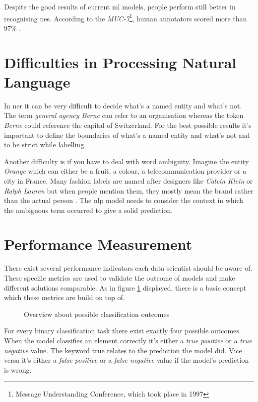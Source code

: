 Despite the good results of current \acrlong{ml} models, people perform still better in recognising \acrshort{ne}s. According to the \emph{MUC-7}\footnote{Message Understanding Conference, which took place in 1997}, human annotators scored more than 97\% \cite{wiki04}. 

\section{Difficulties in Processing Natural Language}

In \acrlong{ner} it can be very difficult to decide what's a named entity and what's not. The term \emph{general agency Berne} can refer to an organisation whereas the token \emph{Berne} could reference the capital of Switzerland. For the best possible results it's important to define the boundaries of what's a named entity and what's not and to be strict while labelling.

Another difficulty is if you have to deal with word ambiguity. Imagine the entity \emph{Orange} which can either be a fruit, a colour, a telecommunication provider or a city in France. Many fashion labels are named after designers like \emph{Calvin Klein} or \emph{Ralph Lauren} but when people mention them, they mostly mean the brand rather than the actual person \cite{Vogel19}. The \acrshort{nlp} model needs to consider the context in which the ambiguous term occurred to give a solid prediction.

\section{Performance Measurement}
\label{chap:formulas}

There exist several performance indicators each data scientist should be aware of. These specific metrics are used to validate the outcome of models and make different solutions comparable. As in figure \ref{fig:metrics} displayed, there is a basic concept which these metrics are build on top of.

\begin{figure}[!ht]
\centering
{}
\caption{Overview about possible classification outcomes\cite{wiki01}}
\label{fig:metrics}
\end{figure}

For every binary classification task there exist exactly four possible outcomes. When the model classifies an element correctly it's either a \emph{true positive} or a \emph{true negative} value. The keyword true relates to the prediction the model did. Vice versa it's either a \emph{false positive} or a \emph{false negative} value if the model's prediction is wrong.

